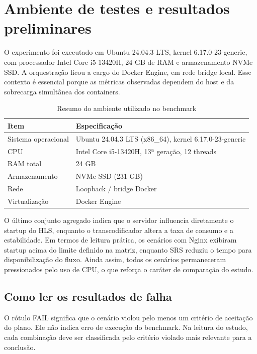 \section{Ambiente de testes e resultados preliminares}

O experimento foi executado em Ubuntu 24.04.3 LTS, kernel 6.17.0-23-generic, com processador Intel Core i5-13420H, 24 GB de RAM e armazenamento NVMe SSD. A orquestração ficou a cargo do Docker Engine, em rede bridge local. Esse contexto é essencial porque as métricas observadas dependem do host e da sobrecarga simultânea dos containers.

\begin{table}[H]
\centering
\caption{Resumo do ambiente utilizado no benchmark}
\begin{tabularx}{\textwidth}{@{}lX@{}}
\toprule
\textbf{Item} & \textbf{Especificação} \\
\midrule
Sistema operacional & Ubuntu 24.04.3 LTS (x86\_64), kernel 6.17.0-23-generic \\
CPU & Intel Core i5-13420H, 13ª geração, 12 threads \\
RAM total & 24 GB \\
Armazenamento & NVMe SSD (231 GB) \\
Rede & Loopback / bridge Docker \\
Virtualização & Docker Engine \\
\bottomrule
\end{tabularx}
\end{table}

O último conjunto agregado indica que o servidor influencia diretamente o startup do HLS, enquanto o transcodificador altera a taxa de consumo e a estabilidade. Em termos de leitura prática, os cenários com Nginx exibiram startup acima do limite definido na matriz, enquanto SRS reduziu o tempo para disponibilização do fluxo. Ainda assim, todos os cenários permaneceram pressionados pelo uso de CPU, o que reforça o caráter de comparação do estudo.

\subsection{Como ler os resultados de falha}

O rótulo FAIL significa que o cenário violou pelo menos um critério de aceitação do plano. Ele não indica erro de execução do benchmark. Na leitura do estudo, cada combinação deve ser classificada pelo critério violado mais relevante para a conclusão.

